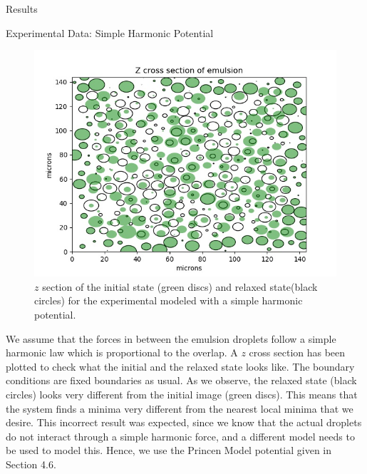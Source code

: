 \documentclass[12pt]{article}
\begin{document}
\begin{section}{Results}
\begin{subsection}{Experimental Data: Simple Harmonic Potential}
\begin{figure}[h!]
    \centering
    \includegraphics{images/relaxed_emulsion_harmonic.jpg}
    \caption{$z$ section of the initial state (green discs) and relaxed state(black circles) for the experimental modeled with a simple harmonic potential.}
    \label{fig:my_label}
\end{figure}
\par \noindent We assume that the forces in between the emulsion droplets follow a simple harmonic law which is proportional to the overlap. A $z$ cross section has been plotted to check what the initial and the relaxed state looks like. The boundary conditions are fixed boundaries as usual. As we observe, the relaxed state (black circles) looks very different from the initial image (green discs). This means that the system finds a minima very different from the nearest local minima that we desire.
This incorrect result was expected, since we know that the actual droplets do not interact through a simple harmonic force, and a different model needs to be used to model this. Hence, we use the Princen Model potential given in Section 4.6.
\end{subsection}


\end{section}
\end{document}
